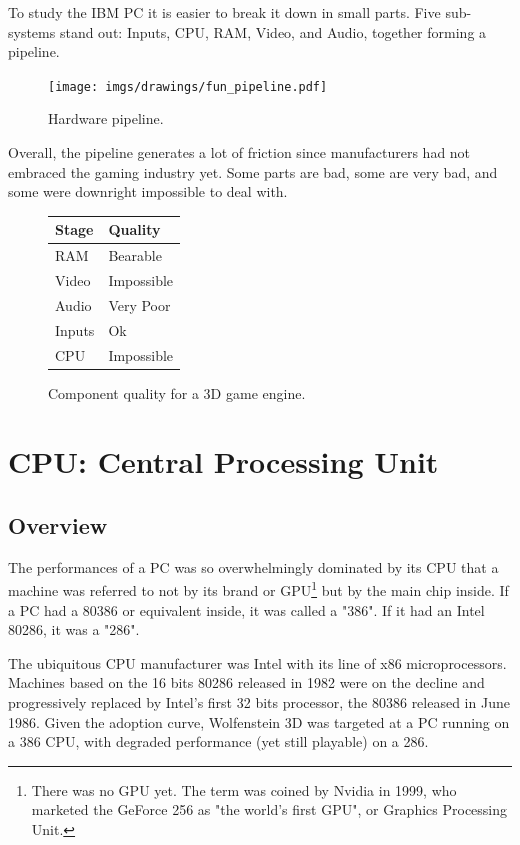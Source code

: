 \documentclass[book.tex]{subfiles}
\begin{document}
To study the IBM PC it is easier to break it down in small parts. Five sub-systems stand out: Inputs, CPU, RAM, Video, and Audio, together forming a pipeline.\\
\begin{figure}[H]
\centering
\texttt{[image: imgs/drawings/fun\_pipeline.pdf]}
\caption{Hardware pipeline.}
\label{fig:digraph}
\end{figure}

Overall, the pipeline generates a lot of friction since manufacturers had not embraced the gaming industry yet. Some parts are bad, some are very bad, and some were downright impossible to deal with.\\
\par

\begin{figure}[H]
\centering
\begin{tabularx}{\textwidth}{ X X  }
  \toprule
  \textbf{Stage} & \textbf{Quality} \\ \bottomrule
  RAM & Bearable \\ 
  Video & Impossible \\ 
  Audio & Very Poor \\ 
  Inputs & Ok \\ 
  CPU & Impossible \\ \bottomrule
\end{tabularx}
\caption{Component quality for a 3D game engine.}
\end{figure}



\section{CPU: Central Processing Unit}
  \subsection{Overview}
  The performances of a PC was so overwhelmingly dominated by its CPU that a machine was referred to not by its brand or GPU\footnote{There was no GPU yet. The term was coined by Nvidia in 1999, who marketed the GeForce 256 as "the world's first GPU", or Graphics Processing Unit.} but by the main chip inside. If a PC had a 80386 or equivalent inside, it was called a "386". If it had an Intel 80286, it was a "286".\\
\par
  The ubiquitous CPU manufacturer was Intel with its line of x86 microprocessors. Machines based on the 16 bits 80286 released in 1982 were on the decline and progressively replaced by Intel's first 32 bits processor, the 80386 released in June 1986. Given the adoption curve, Wolfenstein 3D was targeted at a PC running on a 386 CPU, with degraded performance (yet still playable) on a 286.\\
\par
\end{document}
